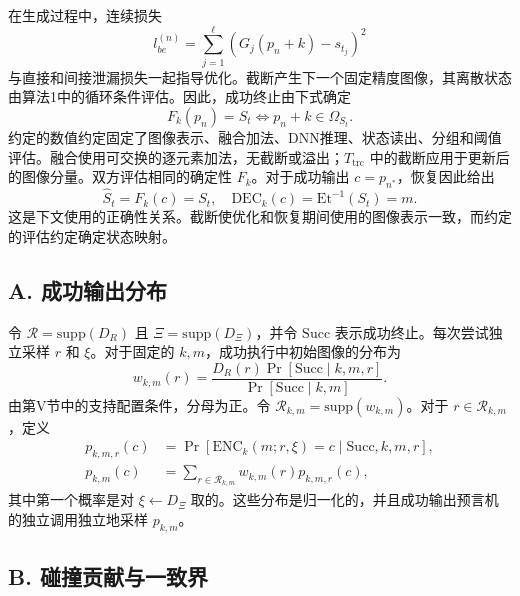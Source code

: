 在生成过程中，连续损失
\begin{equation}
l_{be}^{(n)} = \sum_{j=1}^\ell (G_j(p_n + k) - s_{t_j})^2 \tag{26}
\end{equation}
与直接和间接泄漏损失一起指导优化。截断产生下一个固定精度图像，其离散状态由算法1中的循环条件评估。因此，成功终止由下式确定
\begin{equation}
F_k(p_n) = S_t \iff p_n + k \in \Omega_{S_t}. \tag{27}
\end{equation}
约定的数值约定固定了图像表示、融合加法、DNN推理、状态读出、分组和阈值评估。融合使用可交换的逐元素加法，无截断或溢出；\(T_{\mathrm{trc}}\) 中的截断应用于更新后的图像分量。双方评估相同的确定性 \(F_k\)。对于成功输出 \(c = p_{n^*}\)，恢复因此给出
\begin{equation}
\widehat{S}_t = F_k(c) = S_t, \quad \mathrm{DEC}_k(c) = \mathrm{Et}^{-1}(S_t) = m. \tag{28}
\end{equation}
这是下文使用的正确性关系。截断使优化和恢复期间使用的图像表示一致，而约定的评估约定确定状态映射。

\subsection*{A. 成功输出分布}
令 \(\mathcal{R} = \mathrm{supp}(D_R)\) 且 \(\Xi = \mathrm{supp}(D_\Xi)\)，并令 \(\mathrm{Succ}\) 表示成功终止。每次尝试独立采样 \(r\) 和 \(\xi\)。对于固定的 \(k, m\)，成功执行中初始图像的分布为
\begin{equation}
w_{k,m}(r) = \frac{D_R(r) \Pr[\mathrm{Succ} \mid k, m, r]}{\Pr[\mathrm{Succ} \mid k, m]}. \tag{29}
\end{equation}
由第V节中的支持配置条件，分母为正。令 \(\mathcal{R}_{k,m} = \mathrm{supp}(w_{k,m})\)。对于 \(r \in \mathcal{R}_{k,m}\)，定义
\begin{equation}
\begin{aligned}
p_{k,m,r}(c) &= \Pr[\mathrm{ENC}_k(m; r, \xi) = c \mid \mathrm{Succ}, k, m, r], \\
p_{k,m}(c) &= \sum_{r \in \mathcal{R}_{k,m}} w_{k,m}(r) p_{k,m,r}(c), 
\end{aligned} \tag{30}
\end{equation}
其中第一个概率是对 \(\xi \leftarrow D_\Xi\) 取的。这些分布是归一化的，并且成功输出预言机的独立调用独立地采样 \(p_{k,m}\)。
\subsection*{B. 碰撞贡献与一致界}

